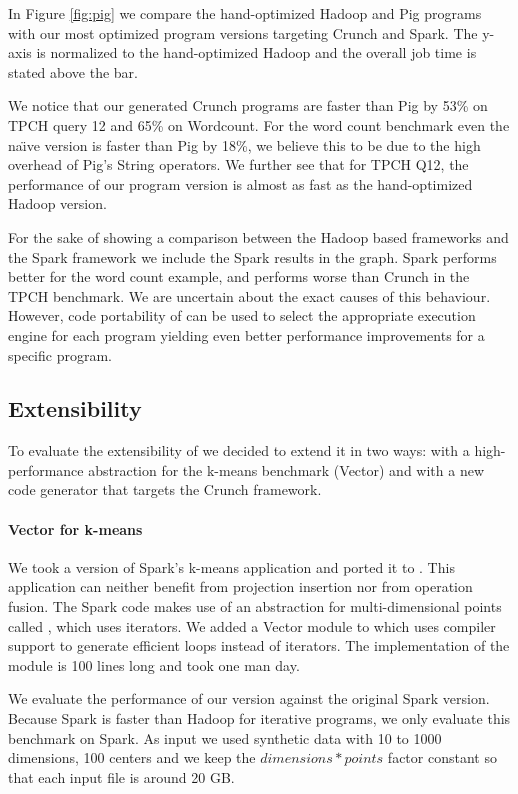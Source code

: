 In Figure \ref{fig:pig} we compare the hand-optimized Hadoop and Pig programs
with our most optimized program versions targeting Crunch and Spark.
The y-axis is normalized to the hand-optimized Hadoop and the overall
job time is stated above the bar. 

We notice that our generated Crunch programs are faster than Pig by 53\% on
TPCH query 12 and 65\% on Wordcount. For the word count benchmark even the na\"{\i}ve
version is faster than Pig by 18\%, we believe this to be due to the high
overhead of Pig's String operators. We further see that for TPCH Q12, the
performance of our program version is almost as fast as the hand-optimized
Hadoop version.

For the sake of showing a comparison between the Hadoop based frameworks
and the Spark framework we include the Spark results in the graph. Spark
performs better for the word count example, and performs worse than Crunch in
the TPCH benchmark. We are uncertain about the exact causes of this behaviour.
However, code portability of \tool can be used to select the appropriate
execution engine for each program yielding even better performance improvements
for a specific program. 

\subsection{Extensibility}
\label{subsec:kmeans}

To evaluate the extensibility of \tool we decided to extend it in two ways: 
with a high-performance abstraction for the k-means benchmark (Vector) and
with a new code generator that targets the Crunch framework.
 
\paragraph{Vector for k-means} 
We took a version of Spark's k-means \cite{spark-nsdi} application and
ported it to \tool. This application can neither benefit from projection
insertion nor from operation fusion. The Spark code makes use of an abstraction
for multi-dimensional points called , which uses iterators. We added
a Vector module to \tool which uses compiler support to generate efficient loops
instead of iterators. The implementation of the  module is 100
lines long and took one man day.

We evaluate the performance of our version against the original Spark version.
Because Spark is faster than Hadoop for iterative programs, we only evaluate
this benchmark on Spark.
As input we used synthetic data with 10 to 1000 dimensions, 100 centers and we
keep the $dimensions * points$ factor constant so that each input file is around 20 GB.

